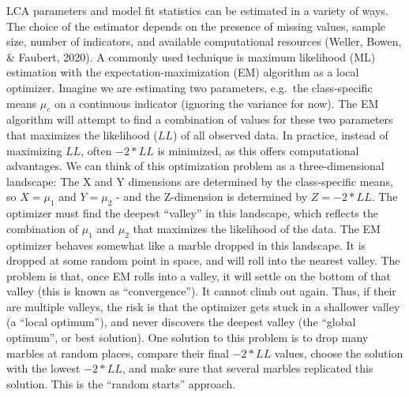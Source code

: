 \documentclass[
  ,man,floatsintext]{apa6}
\begin{document}
LCA parameters and model fit statistics
can be estimated in a variety of ways.
The choice of the estimator
depends on the presence of missing values,
sample size, number of indicators,
and available computational resources (Weller, Bowen, \& Faubert, 2020).
A commonly used technique is maximum likelihood (ML) estimation
with the expectation-maximization (EM) algorithm as a local optimizer.
Imagine we are estimating two parameters,
e.g.~the class-specific means \(\mu_c\) on a continuous indicator
(ignoring the variance for now).
The EM algorithm will attempt to find a combination of values
for these two parameters that maximizes
the likelihood (\(LL\)) of all observed data.
In practice, instead of maximizing \(LL\),
often \(-2*LL\) is minimized,
as this offers computational advantages.
We can think of this optimization problem
as a three-dimensional landscape:
The X and Y dimensions are determined by the class-specific means,
so \(X = \mu_1\) and \(Y = \mu_2\) -
and the Z-dimension is determined by \(Z = -2*LL\).
The optimizer must find the deepest ``valley'' in this landscape,
which reflects the combination of \(\mu_1\) and \(\mu_2\) that
maximizes the likelihood of the data.
The EM optimizer behaves somewhat like a marble dropped in this landscape.
It is dropped at some random point in space,
and will roll into the nearest valley.
The problem is that, once EM rolls into a valley,
it will settle on the bottom of that valley
(this is known as ``convergence'').
It cannot climb out again.
Thus, if their are multiple valleys,
the risk is that the optimizer gets stuck in a shallower valley (a ``local optimum''),
and never discovers the deepest valley (the ``global optimum'', or best solution).
One solution to this problem is to drop many marbles at random places,
compare their final \(-2*LL\) values,
choose the solution with the lowest \(-2*LL\),
and make sure that several marbles replicated this solution.
This is the ``random starts'' approach.
\end{document}
